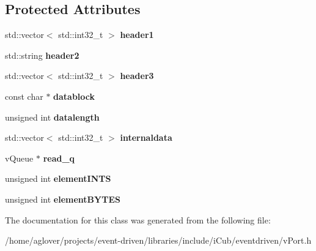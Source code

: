 \subsection*{Protected Attributes}
\begin{DoxyCompactItemize}
\item 
std\+::vector$<$ std\+::int32\+\_\+t $>$ {\bfseries header1}\hypertarget{classev_1_1vGenPortInterface_a52517678289156d670d1895ce1b715fa}{}\label{classev_1_1vGenPortInterface_a52517678289156d670d1895ce1b715fa}

\item 
std\+::string {\bfseries header2}\hypertarget{classev_1_1vGenPortInterface_a90def45fbbb43d6fd1504107de7acc81}{}\label{classev_1_1vGenPortInterface_a90def45fbbb43d6fd1504107de7acc81}

\item 
std\+::vector$<$ std\+::int32\+\_\+t $>$ {\bfseries header3}\hypertarget{classev_1_1vGenPortInterface_adf4480a358ddf4b3d8f9dd470f145e95}{}\label{classev_1_1vGenPortInterface_adf4480a358ddf4b3d8f9dd470f145e95}

\item 
const char $\ast$ {\bfseries datablock}\hypertarget{classev_1_1vGenPortInterface_a94a07df9e3b170643f781de0c8575570}{}\label{classev_1_1vGenPortInterface_a94a07df9e3b170643f781de0c8575570}

\item 
unsigned int {\bfseries datalength}\hypertarget{classev_1_1vGenPortInterface_a186f02b7b192150a8a1ad3fce98429c6}{}\label{classev_1_1vGenPortInterface_a186f02b7b192150a8a1ad3fce98429c6}

\item 
std\+::vector$<$ std\+::int32\+\_\+t $>$ {\bfseries internaldata}\hypertarget{classev_1_1vGenPortInterface_a16707752e155ab7fe4a9e00050a15dc0}{}\label{classev_1_1vGenPortInterface_a16707752e155ab7fe4a9e00050a15dc0}

\item 
v\+Queue $\ast$ {\bfseries read\+\_\+q}\hypertarget{classev_1_1vGenPortInterface_a1326e4dc93f0ee7e84ee4bf844a69608}{}\label{classev_1_1vGenPortInterface_a1326e4dc93f0ee7e84ee4bf844a69608}

\item 
unsigned int {\bfseries element\+I\+N\+TS}\hypertarget{classev_1_1vGenPortInterface_ac7eb1df18fdcdf6212af6e6c064a10fa}{}\label{classev_1_1vGenPortInterface_ac7eb1df18fdcdf6212af6e6c064a10fa}

\item 
unsigned int {\bfseries element\+B\+Y\+T\+ES}\hypertarget{classev_1_1vGenPortInterface_ac7509a578807b862a954d9c7928c1090}{}\label{classev_1_1vGenPortInterface_ac7509a578807b862a954d9c7928c1090}

\end{DoxyCompactItemize}


The documentation for this class was generated from the following file\+:\begin{DoxyCompactItemize}
\item 
/home/aglover/projects/event-\/driven/libraries/include/i\+Cub/eventdriven/v\+Port.\+h\end{DoxyCompactItemize}
